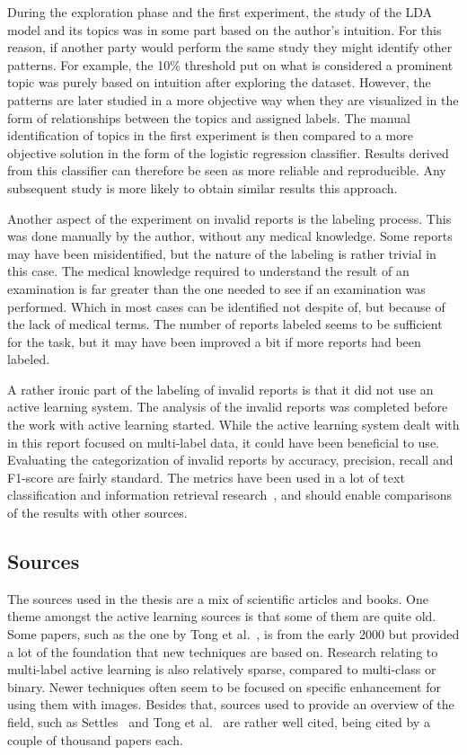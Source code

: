 During the exploration phase and the first experiment, the study of the LDA model and its topics was in some part based on the author's intuition.
For this reason, if another party would perform the same study they might identify other patterns.
For example, the 10\% threshold put on what is considered a prominent topic was purely based on intuition after exploring the dataset.
However, the patterns are later studied in a more objective way when they are visualized in the form of relationships between the topics and assigned labels.
The manual identification of topics in the first experiment is then compared to a more objective solution in the form of the logistic regression classifier.
Results derived from this classifier can therefore be seen as more reliable and reproducible.
Any subsequent study is more likely to obtain similar results this approach.

Another aspect of the experiment on invalid reports is the labeling process.
This was done manually by the author, without any medical knowledge.
Some reports may have been misidentified, but the nature of the labeling is rather trivial in this case.
The medical knowledge required to understand the result of an examination is far greater than the one needed to see if an examination was performed.
Which in most cases can be identified not despite of, but because of the lack of medical terms.
The number of reports labeled seems to be sufficient for the task, but it may have been improved a bit if more reports had been labeled.

A rather ironic part of the labeling of invalid reports is that it did not use an active learning system.
The analysis of the invalid reports was completed before the work with active learning started.
While the active learning system dealt with in this report focused on multi-label data, it could have been beneficial to use.
Evaluating the categorization of invalid reports by accuracy, precision, recall and F1-score are fairly standard.
The metrics have been used in a lot of text classification and information retrieval research~\cite{aggarwal2012surveyclass, bishop2006pattern}, and should enable comparisons of the results with other sources.

\subsection{Sources}

The sources used in the thesis are a mix of scientific articles and books.
One theme amongst the active learning sources is that some of them are quite old.
Some papers, such as the one by Tong et al.~\cite{tong2001support}, is from the early 2000 but provided a lot of the foundation that new techniques are based on.
Research relating to multi-label active learning is also relatively sparse, compared to multi-class or binary.
Newer techniques often seem to be focused on specific enhancement for using them with images.
Besides that, sources used to provide an overview of the field, such as Settles~\cite{settles2012active} and Tong et al\@.~\cite{tong2001active} are rather well cited, being cited by a couple of thousand papers each.


